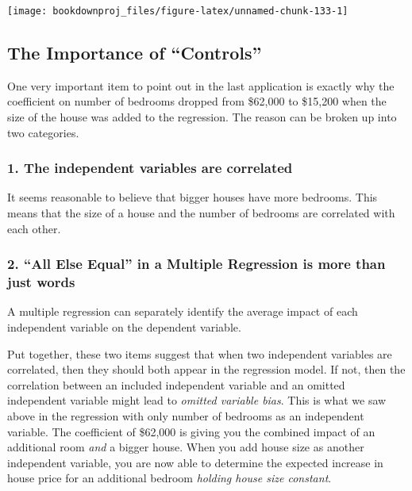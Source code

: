 \documentclass[
]{book}
\begin{document}
\begin{center}\texttt{[image: bookdownproj\_files/figure-latex/unnamed-chunk-133-1]} \end{center}

\hypertarget{the-importance-of-controls}{%
\subsection{The Importance of ``Controls''}\label{the-importance-of-controls}}

One very important item to point out in the last application is exactly why the coefficient on number of bedrooms dropped from \$62,000 to \$15,200 when the size of the house was added to the regression. The reason can be broken up into two categories.

\hypertarget{the-independent-variables-are-correlated}{%
\subsubsection*{1. The independent variables are correlated}\label{the-independent-variables-are-correlated}}

It seems reasonable to believe that bigger houses have more bedrooms. This means that the size of a house and the number of bedrooms are correlated with each other.

\hypertarget{all-else-equal-in-a-multiple-regression-is-more-than-just-words}{%
\subsubsection*{2. ``All Else Equal'' in a Multiple Regression is more than just words}\label{all-else-equal-in-a-multiple-regression-is-more-than-just-words}}

A multiple regression can separately identify the average impact of each independent variable on the dependent variable.

Put together, these two items suggest that when two independent variables are correlated, then they should both appear in the regression model. If not, then the correlation between an included independent variable and an omitted independent variable might lead to \emph{omitted variable bias}. This is what we saw above in the regression with only number of bedrooms as an independent variable. The coefficient of \$62,000 is giving you the combined impact of an additional room \emph{and} a bigger house. When you add house size as another independent variable, you are now able to determine the expected increase in house price for an additional bedroom \emph{holding house size constant}.
\end{document}
